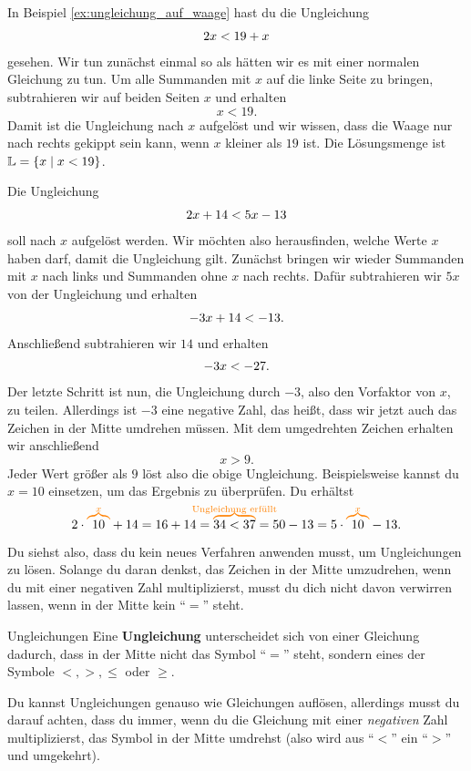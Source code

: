 \documentclass[../../main.tex]{subfiles}
\begin{document}
\begin{example}{}
    In Beispiel \ref{ex:ungleichung_auf_waage} hast du die Ungleichung 
    \[2x<19+x \commentLine{-x}\]
    gesehen. Wir tun zunächst einmal so als hätten wir es mit einer normalen Gleichung zu tun. Um alle Summanden mit $x$ auf die linke Seite zu bringen, subtrahieren wir auf beiden Seiten $x$ und erhalten
    \[x<19.\]
    Damit ist die Ungleichung nach $x$ aufgelöst und wir wissen, dass die Waage nur nach rechts gekippt sein kann, wenn $x$ kleiner als $19$ ist. Die Lösungsmenge ist $\mathbb{L}=\{x\mid x<19\}$.
\end{example}
\begin{example}{}
    Die Ungleichung
    \[2x+14<5x-13 \commentLine{-5x}\]
    soll nach $x$ aufgelöst werden. Wir möchten also herausfinden, welche Werte $x$ haben darf, damit die Ungleichung gilt. Zunächst bringen wir wieder Summanden mit $x$ nach links und Summanden ohne $x$ nach rechts. Dafür subtrahieren wir $5x$ von der Ungleichung und erhalten
    \[-3x+14<-13. \commentLine{-14}\]
    Anschließend subtrahieren wir $14$ und erhalten
    \[-3x<-27. \commentLine{:(-3)}\]
    Der letzte Schritt ist nun, die Ungleichung durch $-3$, also den Vorfaktor von $x$, zu teilen. Allerdings ist $-3$ eine negative Zahl, das heißt, dass wir jetzt auch das Zeichen in der Mitte umdrehen müssen. Mit dem umgedrehten Zeichen erhalten wir anschließend
    \[x>9.\]
    Jeder Wert größer als $9$ löst also die obige Ungleichung. Beispielsweise kannst du $x=10$ einsetzen, um das Ergebnis zu überprüfen. Du erhältst
    \[2\cdot\colorobrace{10}{x}+14=16+14=\colorobrace{34<37}{\text{Ungleichung~erfüllt}}=50-13=5\cdot \colorobrace{10}{x}-13.\]
\end{example}

Du siehst also, dass du kein neues Verfahren anwenden musst, um Ungleichungen zu lösen. Solange du daran denkst, das Zeichen in der Mitte umzudrehen, wenn du mit einer negativen Zahl multiplizierst, musst du dich nicht davon verwirren lassen, wenn in der Mitte kein \enquote{$=$} steht.

\begin{nutshell}{Ungleichungen}
    Eine \textbf{Ungleichung} unterscheidet sich von einer Gleichung dadurch, dass in der Mitte nicht das Symbol \enquote{$=$} steht, sondern eines der Symbole $<,>,\leq$ oder $\geq$.
    \vspace*{2mm}
    
    Du kannst Ungleichungen genauso wie Gleichungen auflösen, allerdings musst du darauf achten, dass du immer, wenn du die Gleichung mit einer \emph{negativen} Zahl multiplizierst, das Symbol in der Mitte umdrehst (also wird aus \enquote{$<$} ein \enquote{$>$} und umgekehrt).
\end{nutshell}
\end{document}
